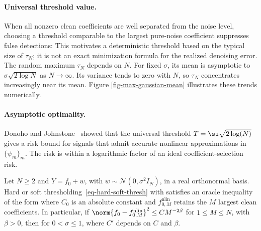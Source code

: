 \paragraph{Universal threshold value.}

When all nonzero clean coefficients are well separated from the noise level, choosing a threshold comparable to the largest pure-noise coefficient suppresses false detections:
This motivates a deterministic threshold based on the typical size of $\tau_N$; it is not an exact minimization formula for the realized denoising error.
The random maximum $\tau_N$ depends on $N$. For fixed $\sigma$, its mean is asymptotic to $\sigma\sqrt{2\log N}$ as $N\to\infty$. Its variance tends to zero with $N$, so $\tau_N$ concentrates increasingly near its mean. Figure \ref{fig-max-gaussian-mean} illustrates these trends numerically.



\paragraph{Asymptotic optimality.}

Donoho and Johnstone~\cite{donoho-shrinkage} showed that the universal threshold $T = \si \sqrt{2 \log(N)}$ gives a risk bound for signals that admit accurate nonlinear approximations in $\{\psi_m\}_m$. The risk is within a logarithmic factor of an ideal coefficient-selection risk.


\begin{thm}\label{thm-nonlinear-denoising}
Let $N\geq2$ and $Y=f_0+w$, with $w\sim\mathcal N(0,\sigma^2I_N)$, in a real orthonormal basis. Hard or soft thresholding~\eqref{eq-hard-soft-thresh} with
satisfies an oracle inequality of the form
where $C_0$ is an absolute constant and $f_{0,M}^{\mathrm{nlin}}$ retains the $M$ largest clean coefficients. In particular, if $\norm{f_0-f_{0,M}^{\mathrm{nlin}}}^2\leq CM^{-2\beta}$ for $1\leq M\leq N$, with $\beta>0$, then for $0<\sigma\leq1$,
where $C'$ depends on $C$ and $\beta$.
\end{thm}

